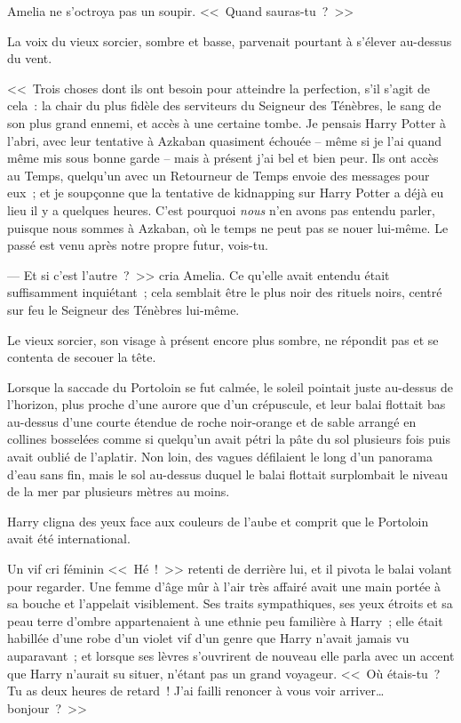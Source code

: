 Amelia ne s'octroya pas un soupir. <<~Quand sauras-tu~?~>>

La voix du vieux sorcier, sombre et basse, parvenait pourtant à s'élever au-dessus du vent.

<<~Trois choses dont ils ont besoin pour atteindre la perfection, s'il s'agit de cela~: la chair du plus fidèle des serviteurs du Seigneur des Ténèbres, le sang de son plus grand ennemi, et accès à une certaine tombe. Je pensais Harry Potter à l'abri, avec leur tentative à Azkaban quasiment échouée -- même si je l'ai quand même mis sous bonne garde -- mais à présent j'ai bel et bien peur. Ils ont accès au Temps, quelqu'un avec un Retourneur de Temps envoie des messages pour eux~; et je soupçonne que la tentative de kidnapping sur Harry Potter a déjà eu lieu il y a quelques heures. C'est pourquoi \emph{nous} n'en avons pas entendu parler, puisque nous sommes à Azkaban, où le temps ne peut pas se nouer lui-même. Le passé est venu après notre propre futur, vois-tu.

--- Et si c'est l'autre~?~>> cria Amelia. Ce qu'elle avait entendu était suffisamment inquiétant~; cela semblait être le plus noir des rituels noirs, centré sur feu le Seigneur des Ténèbres lui-même.

Le vieux sorcier, son visage à présent encore plus sombre, ne répondit pas et se contenta de secouer la tête.

\later

Lorsque la saccade du Portoloin se fut calmée, le soleil pointait juste au-dessus de l'horizon, plus proche d'une aurore que d'un crépuscule, et leur balai flottait bas au-dessus d'une courte étendue de roche noir-orange et de sable arrangé en collines bosselées comme si quelqu'un avait pétri la pâte du sol plusieurs fois puis avait oublié de l'aplatir. Non loin, des vagues défilaient le long d'un panorama d'eau sans fin, mais le sol au-dessus duquel le balai flottait surplombait le niveau de la mer par plusieurs mètres au moins.

Harry cligna des yeux face aux couleurs de l'aube et comprit que le Portoloin avait été international.

Un vif cri féminin <<~Hé~!~>> retenti de derrière lui, et il pivota le balai volant pour regarder. Une femme d'âge mûr à l'air très affairé avait une main portée à sa bouche et l'appelait visiblement. Ses traits sympathiques, ses yeux étroits et sa peau terre d'ombre appartenaient à une ethnie peu familière à Harry~; elle était habillée d'une robe d'un violet vif d'un genre que Harry n'avait jamais vu auparavant~; et lorsque ses lèvres s'ouvrirent de nouveau elle parla avec un accent que Harry n'aurait su situer, n'étant pas un grand voyageur. <<~Où étais-tu~? Tu as deux heures de retard~! J'ai failli renoncer à vous voir arriver… bonjour~?~>>

